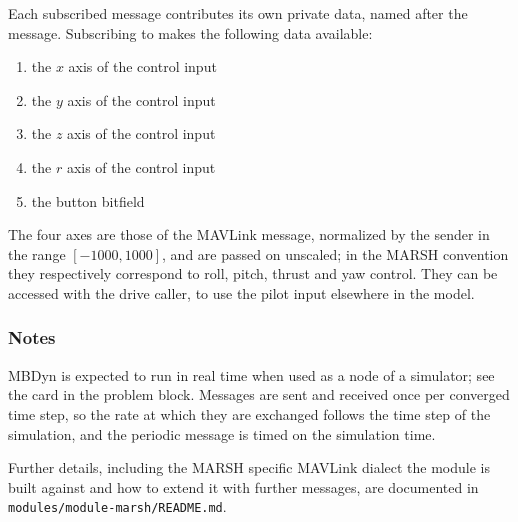 Each subscribed message contributes its own private data, named after the
message.
Subscribing to  makes the following data available:
\begin{enumerate}
\item {} the $x$ axis of the control input
\item {} the $y$ axis of the control input
\item {} the $z$ axis of the control input
\item {} the $r$ axis of the control input
\item {} the button bitfield
\end{enumerate}
The four axes are those of the MAVLink message, normalized by the sender in
the range $[-1000, 1000]$, and are passed on unscaled; in the MARSH
convention they respectively correspond to roll, pitch, thrust and yaw
control.
They can be accessed with the  drive caller, to use the pilot
input elsewhere in the model.

\subsubsection{Notes}

MBDyn is expected to run in real time when used as a node of a simulator;
see the  card in the  problem block.
Messages are sent and received once per converged time step, so the rate at
which they are exchanged follows the time step of the simulation, and the
periodic  message is timed on the simulation time.

Further details, including the MARSH specific MAVLink dialect the module is
built against and how to extend it with further messages, are documented in
\texttt{modules/module-marsh/README.md}.
